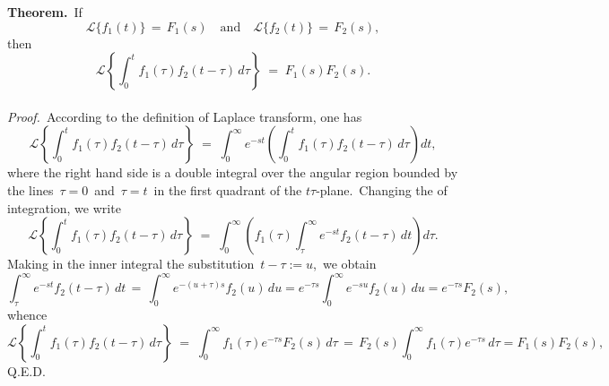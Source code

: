\documentclass[12pt]{article}
\theoremstyle{definition}
\begin{document}
\textbf{Theorem.}\, If
$$\mathcal{L}\{f_1(t)\} \,=\, F_1(s) \quad\mbox{and}\quad \mathcal{L}\{f_2(t)\} \,=\, F_2(s),$$
then
$$\mathcal{L}\left\{\int_0^tf_1(\tau)f_2(t-\tau)\,d\tau\right\} \;=\; F_1(s)F_2(s).$$\\

{\em Proof.}\, According to the definition of Laplace transform, one has
$$\mathcal{L}\left\{\int_0^tf_1(\tau)f_2(t-\tau)\,d\tau\right\} 
 \;=\; \int_0^\infty e^{-st}\left(\int_0^t f_1(\tau)f_2(t-\tau)\,d\tau\right)dt,$$
where the right hand side is a double integral over the angular region bounded by the lines \,$\tau = 0$\, and\, $\tau = t$\, in the first quadrant of the $t\tau$-plane.\, Changing the  of integration, we write
$$\mathcal{L}\left\{\int_0^tf_1(\tau)f_2(t-\tau)\,d\tau\right\} 
 \;=\; \int_0^\infty\left(f_1(\tau)\int_\tau^\infty e^{-st}f_2(t-\tau)\,dt\right)d\tau.$$
Making in the inner integral the substitution\, $t-\tau := u$,\, we obtain
$$\int_\tau^\infty e^{-st}f_2(t-\tau)\,dt \,=\, \int_0^\infty e^{-(u+\tau)s}f_2(u)\,du 
= e^{-\tau s}\int_0^\infty e^{-su}f_2(u)\,du = e^{-\tau s}F_2(s),$$
whence
$$\mathcal{L}\left\{\int_0^tf_1(\tau)f_2(t-\tau)\,d\tau\right\} \;=\; \int_0^\infty f_1(\tau)e^{-\tau s}F_2(s)\,d\tau 
\,=\, F_2(s)\int_0^\infty f_1(\tau)e^{-\tau s}\,d\tau  = F_1(s)F_2(s),$$
Q.E.D.

\end{document}
